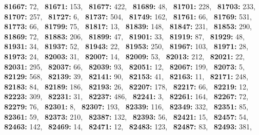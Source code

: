 \textbf{81667:} 72,\allowbreak~ 
\textbf{81671:} 153,\allowbreak~ 
\textbf{81677:} 422,\allowbreak~ 
\textbf{81689:} 48,\allowbreak~ 
\textbf{81701:} 228,\allowbreak~ 
\textbf{81703:} 233,\allowbreak~ 
\textbf{81707:} 257,\allowbreak~ 
\textbf{81727:} 6,\allowbreak~ 
\textbf{81737:} 504,\allowbreak~ 
\textbf{81749:} 162,\allowbreak~ 
\textbf{81761:} 66,\allowbreak~ 
\textbf{81769:} 531,\allowbreak~ 
\textbf{81773:} 66,\allowbreak~ 
\textbf{81799:} 75,\allowbreak~ 
\textbf{81817:} 13,\allowbreak~ 
\textbf{81839:} 148,\allowbreak~ 
\textbf{81847:} 231,\allowbreak~ 
\textbf{81853:} 290,\allowbreak~ 
\textbf{81869:} 72,\allowbreak~ 
\textbf{81883:} 206,\allowbreak~ 
\textbf{81899:} 47,\allowbreak~ 
\textbf{81901:} 33,\allowbreak~ 
\textbf{81919:} 87,\allowbreak~ 
\textbf{81929:} 48,\allowbreak~ 
\textbf{81931:} 34,\allowbreak~ 
\textbf{81937:} 52,\allowbreak~ 
\textbf{81943:} 22,\allowbreak~ 
\textbf{81953:} 250,\allowbreak~ 
\textbf{81967:} 103,\allowbreak~ 
\textbf{81971:} 28,\allowbreak~ 
\textbf{81973:} 24,\allowbreak~ 
\textbf{82003:} 31,\allowbreak~ 
\textbf{82007:} 14,\allowbreak~ 
\textbf{82009:} 53,\allowbreak~ 
\textbf{82013:} 212,\allowbreak~ 
\textbf{82021:} 22,\allowbreak~ 
\textbf{82031:} 295,\allowbreak~ 
\textbf{82037:} 66,\allowbreak~ 
\textbf{82039:} 93,\allowbreak~ 
\textbf{82051:} 12,\allowbreak~ 
\textbf{82067:} 199,\allowbreak~ 
\textbf{82073:} 5,\allowbreak~ 
\textbf{82129:} 568,\allowbreak~ 
\textbf{82139:} 39,\allowbreak~ 
\textbf{82141:} 90,\allowbreak~ 
\textbf{82153:} 41,\allowbreak~ 
\textbf{82163:} 11,\allowbreak~ 
\textbf{82171:} 248,\allowbreak~ 
\textbf{82183:} 84,\allowbreak~ 
\textbf{82189:} 186,\allowbreak~ 
\textbf{82193:} 26,\allowbreak~ 
\textbf{82207:} 178,\allowbreak~ 
\textbf{82217:} 66,\allowbreak~ 
\textbf{82219:} 12,\allowbreak~ 
\textbf{82223:} 309,\allowbreak~ 
\textbf{82231:} 31,\allowbreak~ 
\textbf{82237:} 486,\allowbreak~ 
\textbf{82241:} 3,\allowbreak~ 
\textbf{82261:} 164,\allowbreak~ 
\textbf{82267:} 72,\allowbreak~ 
\textbf{82279:} 76,\allowbreak~ 
\textbf{82301:} 8,\allowbreak~ 
\textbf{82307:} 193,\allowbreak~ 
\textbf{82339:} 116,\allowbreak~ 
\textbf{82349:} 332,\allowbreak~ 
\textbf{82351:} 85,\allowbreak~ 
\textbf{82361:} 59,\allowbreak~ 
\textbf{82373:} 210,\allowbreak~ 
\textbf{82387:} 132,\allowbreak~ 
\textbf{82393:} 56,\allowbreak~ 
\textbf{82421:} 15,\allowbreak~ 
\textbf{82457:} 54,\allowbreak~ 
\textbf{82463:} 142,\allowbreak~ 
\textbf{82469:} 14,\allowbreak~ 
\textbf{82471:} 12,\allowbreak~ 
\textbf{82483:} 123,\allowbreak~ 
\textbf{82487:} 83,\allowbreak~ 
\textbf{82493:} 381,\allowbreak~ 
